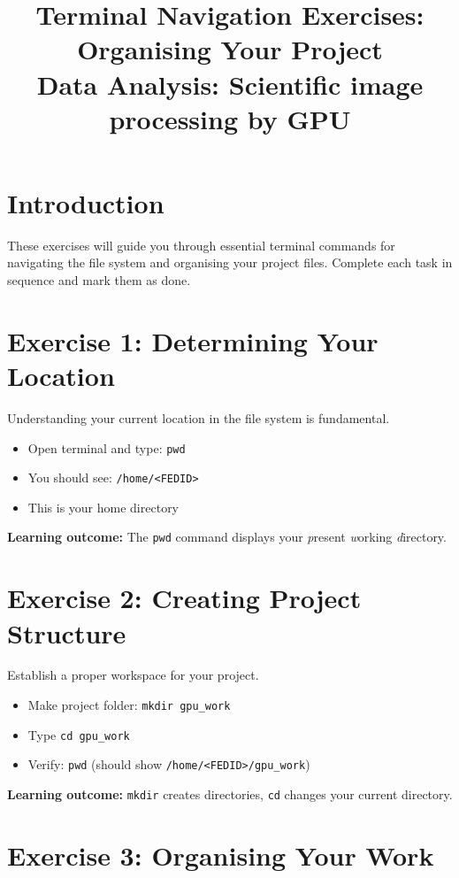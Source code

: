 \documentclass[11pt, a4paper]{article}
\title{Terminal Navigation Exercises: Organising Your Project\\[0.5em]
\large\textbf{Data Analysis: Scientific image processing by GPU}}
\author{}
\date{}
\newcommand{\code}[1]{\texttt{#1}}
\begin{document}
\maketitle

\section*{Introduction}

These exercises will guide you through essential terminal commands for navigating the file system and organising your project files. Complete each task in sequence and mark them as done.

\section*{Exercise 1: Determining Your Location}

Understanding your current location in the file system is fundamental.

\begin{itemize}
    \item Open terminal and type: \code{pwd}
    \item You should see: \code{/home/<FEDID>}
    \item This is your home directory
\end{itemize}

\textbf{Learning outcome:} The \code{pwd} command displays your \textit{p}resent \textit{w}orking \textit{d}irectory.

\section*{Exercise 2: Creating Project Structure}

Establish a proper workspace for your project.

\begin{itemize}
    \item Make project folder: \code{mkdir gpu\_work}
    \item Type \code{cd gpu\_work}
    \item Verify: \code{pwd} (should show \code{/home/<FEDID>/gpu\_work})
\end{itemize}

\textbf{Learning outcome:} \code{mkdir} creates directories, \code{cd} changes your current directory.

\section*{Exercise 3: Organising Your Work}
\end{document}
